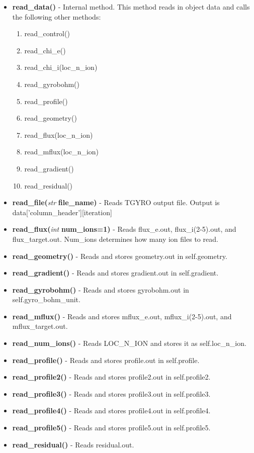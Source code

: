 \documentclass{article}
\begin{document}
\begin{itemize}
\begin{itemize}
\item \textbf{read\_data()} - Internal method.  This method reads in object data and calls the following other methods:
\begin{enumerate}
\item read\_control()
\item read\_chi\_e()
\item read\_chi\_i(loc\_n\_ion)
\item read\_gyrobohm()
\item read\_profile()
\item read\_geometry()
\item read\_flux(loc\_n\_ion)
\item read\_mflux(loc\_n\_ion)
\item read\_gradient()
\item read\_residual()
\end{enumerate}
\item \textbf{read\_file(}\emph{str}\textbf{ file\_name)} - Reads TGYRO output file.  Output is data['column\_header'][iteration]
\item \textbf{read\_flux(}\emph{int}\textbf{ num\_ions=1)} - Reads flux\_e.out, flux\_i(2-5).out, and flux\_target.out.  Num\_ions determines how many ion files to read.
\item \textbf{read\_geometry()} - Reads and stores geometry.out in self.geometry.
\item \textbf{read\_gradient()} - Reads and stores gradient.out in self.gradient.
\item \textbf{read\_gyrobohm()} - Reads and stores gyrobohm.out in self.gyro\_bohm\_unit.
\item \textbf{read\_mflux()} - Reads and stores mflux\_e.out, mflux\_i(2-5).out, and mflux\_target.out.
\item \textbf{read\_num\_ions()} - Reads LOC\_N\_ION and stores it as self.loc\_n\_ion.
\item \textbf{read\_profile()} - Reads and stores profile.out in self.profile.
\item \textbf{read\_profile2()} - Reads and stores profile2.out in self.profile2.
\item \textbf{read\_profile3()} - Reads and stores profile3.out in self.profile3.
\item \textbf{read\_profile4()} - Reads and stores profile4.out in self.profile4.
\item \textbf{read\_profile5()} - Reads and stores profile5.out in self.profile5.
\item \textbf{read\_residual()} - Reads residual.out.

\end{itemize}
\end{itemize}
\end{document}
